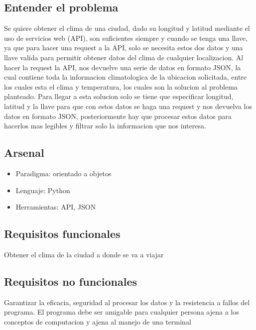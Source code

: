 \documentclass[12pt]{article}
\begin{document}
\subsection{Entender el problema}
Se quiere obtener el clima de una ciudad, dado su longitud y latitud mediante el uso de servicios web (API), son suficientes siempre y cuando se tenga una llave, ya que para hacer una request a la API, solo se necesita estos dos datos y una llave valida para permitir obtener datos del clima de cualquier localizacion. Al hacer la request la API, nos devuelve una serie de datos en formato JSON, la cual contiene toda la informacion climatologica de la ubicacion solicitada, entre los cuales esta el clima y temperatura, los cuales son la solucion al problema planteado. Para llegar a esta solucion solo se tiene que especificar longitud, latitud y la llave para que con estos datos se haga una request y nos devuelva los datos en formato JSON, posteriormente hay que procesar estos datos para hacerlos mas legibles y filtrar solo la informacion que nos interesa.
\subsection{Arsenal}
\begin{itemize}
\item Paradigma: orientado a objetos
\item Lenguaje: Python
\item Herramientas: API, JSON
\end{itemize}
\subsection{Requisitos funcionales}
Obtener el clima de la ciudad a donde se va a viajar
\subsection{Requisitos no funcionales}
Garantizar la eficacia, seguridad al procesar los datos y la resistencia a fallos del programa. El programa debe ser amigable para cualquier persona ajena a los conceptos de computacion y ajena al manejo de una terminal
\end{document}

